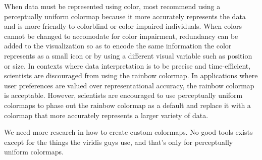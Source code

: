 \documentclass[journal,12pt]{IEEEtran}
\begin{document}
When data must be represented using color, most recommend using a perceptually
uniform colormap because it more accurately represents the data and is more 
friendly to colorblind or color impaired individuals. When colors cannot be changed
to accomodate for color impairment, redundancy can be added to the visualization
so as to encode the same information the color represents as a small icon or by using
a different visual variable such as position or size. In contexts where data
interpretation is to be precise and time-efficient, scientists are discouraged from
using the rainbow colormap. In applications where user preferences are valued over representational accuracy, the rainbow colormap is acceptable. However, scientists
are encouraged to use perceptually uniform colormaps to phase out the rainbow colormap
as a default and replace it with a colormap that more accurately represents a larger
variety of data.

We need more research in how to create custom colormaps. No good tools exists except for the things the viridis guys use, and that's only for perceptually uniform colormaps.



\newpage



\end{document}
